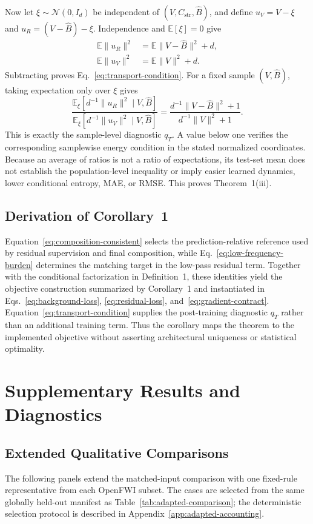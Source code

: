 \documentclass[letterpaper]{article}
\begin{document}
Now let $\xi\sim\mathcal N(0,I_d)$ be independent of $(V,C_{\mathrm{str}},\hat B)$, and define $u_V=V-\xi$ and $u_R=(V-\hat B)-\xi$. Independence and $\mathbb E[\xi]=0$ give
\begin{align}
\mathbb E\|u_R\|^2
&=
\mathbb E\|V-\hat B\|^2+d,\\
\mathbb E\|u_V\|^2
&=
\mathbb E\|V\|^2+d.
\end{align}
Subtracting proves Eq.~\ref{eq:transport-condition}. For a fixed sample $(V,\hat B)$, taking expectation only over $\xi$ gives
\begin{equation}
\frac{\mathbb E_{\xi}[d^{-1}\|u_R\|^2\mid V,\hat B]}
{\mathbb E_{\xi}[d^{-1}\|u_V\|^2\mid V,\hat B]}
=
\frac{d^{-1}\|V-\hat B\|^2+1}{d^{-1}\|V\|^2+1}.
\end{equation}
This is exactly the sample-level diagnostic $q_T$. A value below one verifies the corresponding samplewise energy condition in the stated normalized coordinates. Because an average of ratios is not a ratio of expectations, its test-set mean does not establish the population-level inequality or imply easier learned dynamics, lower conditional entropy, MAE, or RMSE. This proves Theorem~1(iii).

\subsection{Derivation of Corollary~1}
Equation~\ref{eq:composition-consistent} selects the prediction-relative reference used by residual supervision and final composition, while Eq.~\ref{eq:low-frequency-burden} determines the matching target in the low-pass residual term. Together with the conditional factorization in Definition~1, these identities yield the objective construction summarized by Corollary~1 and instantiated in Eqs.~\ref{eq:background-loss}, \ref{eq:residual-loss}, and~\ref{eq:gradient-contract}. Equation~\ref{eq:transport-condition} supplies the post-training diagnostic $q_T$ rather than an additional training term. Thus the corollary maps the theorem to the implemented objective without asserting architectural uniqueness or statistical optimality.


\section{Supplementary Results and Diagnostics}
\label{app:supplementary-results}

\subsection{Extended Qualitative Comparisons}
The following panels extend the matched-input comparison with one fixed-rule representative from each OpenFWI subset. The cases are selected from the same globally held-out manifest as Table~\ref{tab:adapted-comparison}; the deterministic selection protocol is described in Appendix~\ref{app:adapted-accounting}.
\end{document}
